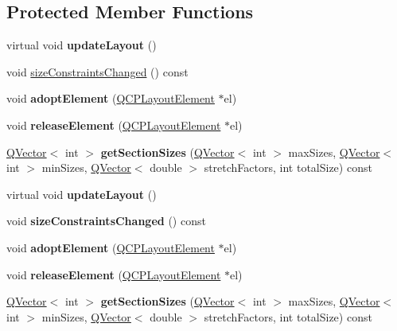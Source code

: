 \subsection*{Protected Member Functions}
\begin{DoxyCompactItemize}
\item 
\mbox{\label{class_q_c_p_layout_a165c77f6287ac92e8d03017ad913378b}} 
virtual void {\bfseries update\+Layout} ()
\item 
void \hyperlink{class_q_c_p_layout_aeac66a292f65cf7f8adf94eb92345b3e}{size\+Constraints\+Changed} () const
\item 
\mbox{\label{class_q_c_p_layout_af6dbbc24156a808da29cd1ec031729a3}} 
void {\bfseries adopt\+Element} (\hyperlink{class_q_c_p_layout_element}{Q\+C\+P\+Layout\+Element} $\ast$el)
\item 
\mbox{\label{class_q_c_p_layout_a4afbb4bef0071f72f91afdac4433a18e}} 
void {\bfseries release\+Element} (\hyperlink{class_q_c_p_layout_element}{Q\+C\+P\+Layout\+Element} $\ast$el)
\item 
\mbox{\label{class_q_c_p_layout_a3e77be8006d39f2aafc1313d6e8fc3fd}} 
\hyperlink{class_q_vector}{Q\+Vector}$<$ int $>$ {\bfseries get\+Section\+Sizes} (\hyperlink{class_q_vector}{Q\+Vector}$<$ int $>$ max\+Sizes, \hyperlink{class_q_vector}{Q\+Vector}$<$ int $>$ min\+Sizes, \hyperlink{class_q_vector}{Q\+Vector}$<$ double $>$ stretch\+Factors, int total\+Size) const
\item 
\mbox{\label{class_q_c_p_layout_afbc3f7cf3fc41baacd58391bb2086ea8}} 
virtual void {\bfseries update\+Layout} ()
\item 
\mbox{\label{class_q_c_p_layout_aeac66a292f65cf7f8adf94eb92345b3e}} 
void {\bfseries size\+Constraints\+Changed} () const
\item 
\mbox{\label{class_q_c_p_layout_af6dbbc24156a808da29cd1ec031729a3}} 
void {\bfseries adopt\+Element} (\hyperlink{class_q_c_p_layout_element}{Q\+C\+P\+Layout\+Element} $\ast$el)
\item 
\mbox{\label{class_q_c_p_layout_a4afbb4bef0071f72f91afdac4433a18e}} 
void {\bfseries release\+Element} (\hyperlink{class_q_c_p_layout_element}{Q\+C\+P\+Layout\+Element} $\ast$el)
\item 
\mbox{\label{class_q_c_p_layout_aa1cf1dd54ab07a056550aa1a602194ac}} 
\hyperlink{class_q_vector}{Q\+Vector}$<$ int $>$ {\bfseries get\+Section\+Sizes} (\hyperlink{class_q_vector}{Q\+Vector}$<$ int $>$ max\+Sizes, \hyperlink{class_q_vector}{Q\+Vector}$<$ int $>$ min\+Sizes, \hyperlink{class_q_vector}{Q\+Vector}$<$ double $>$ stretch\+Factors, int total\+Size) const
\end{DoxyCompactItemize}

